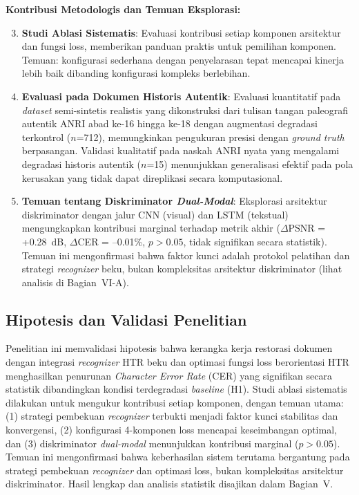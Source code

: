 \documentclass[journal]{IEEEtran}
\begin{document}
\textbf{Kontribusi Metodologis dan Temuan Eksplorasi:}
\begin{enumerate}
    \setcounter{enumi}{2}
    \item \textbf{Studi Ablasi Sistematis}: Evaluasi kontribusi setiap komponen arsitektur dan fungsi loss, memberikan panduan praktis untuk pemilihan komponen. Temuan: konfigurasi sederhana dengan penyelarasan tepat mencapai kinerja lebih baik dibanding konfigurasi kompleks berlebihan.
    
    \item \textbf{Evaluasi pada Dokumen Historis Autentik}: Evaluasi kuantitatif pada \textit{dataset} semi-sintetis realistis yang dikonstruksi dari tulisan tangan paleografi autentik ANRI abad ke-16 hingga ke-18 dengan augmentasi degradasi terkontrol ($n$=712), memungkinkan pengukuran presisi dengan \textit{ground truth} berpasangan. Validasi kualitatif pada naskah ANRI nyata yang mengalami degradasi historis autentik ($n$=15) menunjukkan generalisasi efektif pada pola kerusakan yang tidak dapat direplikasi secara komputasional.
    
    \item \textbf{Temuan tentang Diskriminator \textit{Dual-Modal}}: Eksplorasi arsitektur diskriminator dengan jalur CNN (visual) dan LSTM (tekstual) mengungkapkan kontribusi marginal terhadap metrik akhir ($\Delta$PSNR = +0.28~dB, $\Delta$CER = --0.01\%, $p>0.05$, tidak signifikan secara statistik). Temuan ini mengonfirmasi bahwa faktor kunci adalah protokol pelatihan dan strategi \textit{recognizer} beku, bukan kompleksitas arsitektur diskriminator (lihat analisis di Bagian~VI-A).
\end{enumerate}

\subsection{Hipotesis dan Validasi Penelitian}

Penelitian ini memvalidasi hipotesis bahwa kerangka kerja restorasi dokumen dengan integrasi \textit{recognizer} HTR beku dan optimasi fungsi loss berorientasi HTR menghasilkan penurunan \textit{Character Error Rate} (CER) yang signifikan secara statistik dibandingkan kondisi terdegradasi \textit{baseline} (H1). Studi ablasi sistematis dilakukan untuk mengukur kontribusi setiap komponen, dengan temuan utama: (1) strategi pembekuan \textit{recognizer} terbukti menjadi faktor kunci stabilitas dan konvergensi, (2) konfigurasi 4-komponen loss mencapai keseimbangan optimal, dan (3) diskriminator \textit{dual-modal} menunjukkan kontribusi marginal ($p>0.05$). Temuan ini mengonfirmasi bahwa keberhasilan sistem terutama bergantung pada strategi pembekuan \textit{recognizer} dan optimasi loss, bukan kompleksitas arsitektur diskriminator. Hasil lengkap dan analisis statistik disajikan dalam Bagian~V.
\end{document}
